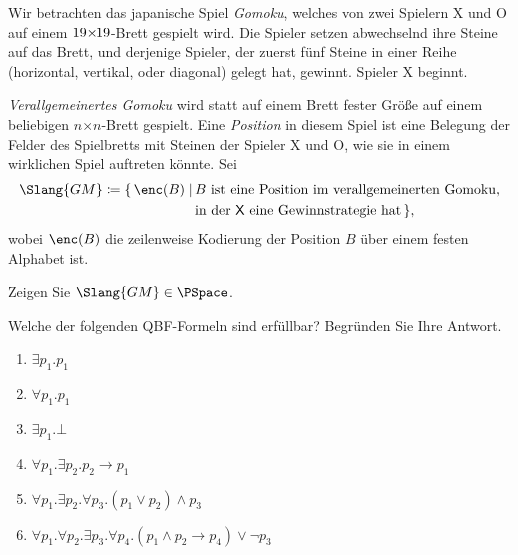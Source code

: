 \documentclass[german]{latteachCD}[2017/03/28]
\begin{document}
\begin{exercise}
  Wir betrachten das japanische Spiel \emph{Gomoku}, welches von zwei Spielern
  \textsf{X} und \textsf{O} auf einem $19{\times}\mskip-2mu19$-Brett %
  gespielt wird.  Die Spieler setzen abwechselnd ihre Steine auf das Brett, und
  derjenige Spieler, der zuerst fünf Steine in einer Reihe (horizontal,
  vertikal, oder diagonal) gelegt hat, gewinnt.  Spieler \textsf{X} beginnt.

  \emph{Verallgemeinertes Gomoku} wird statt auf einem Brett fester Größe auf
  einem beliebigen $n\mathord{\times}n$-Brett gespielt.  Eine \emph{Position} in
  diesem Spiel ist eine Belegung der Felder des Spielbretts mit Steinen der
  Spieler \textsf{X} und \textsf{O}, wie sie in einem wirklichen Spiel auftreten
  könnte.  Sei
  \begin{align*}
    \Slang{GM} \coloneqq \{\,\enc(B) \mid \, %
    & B \text{ ist eine Position im verallgemeinerten Gomoku,} \\
    & \text{in der \textsf{X} eine Gewinnstrategie hat}\,\},
  \end{align*}
  wobei $\enc(B)$ die zeilenweise Kodierung der Position $B$ über einem festen
  Alphabet ist.

  Zeigen Sie $\Slang{GM} \in \PSpace$.
\end{exercise}

\begin{exercise}
  Welche der folgenden QBF-Formeln sind erfüllbar?  Begründen Sie Ihre Antwort.
  \begin{enumerate}
  \item $\exists p_{1}. p_{1}$
  \item $\forall p_{1}. p_{1}$
  \item $\exists p_{1}. \bot$
  \item $\forall p_{1}. \exists p_{2}. p_{2} \to p_{1}$
  \item $\forall p_{1}. \exists p_{2}. \forall p_{3}. (p_{1} \lor p_{2}) \land
    p_{3}$
  \item $\forall p_{1}. \forall p_{2}. \exists p_{3}. \forall p_{4}. (p_{1}
    \land p_{2} \to p_{4}) \lor \lnot p_{3}$
  \end{enumerate}

\end{exercise}
\end{document}
